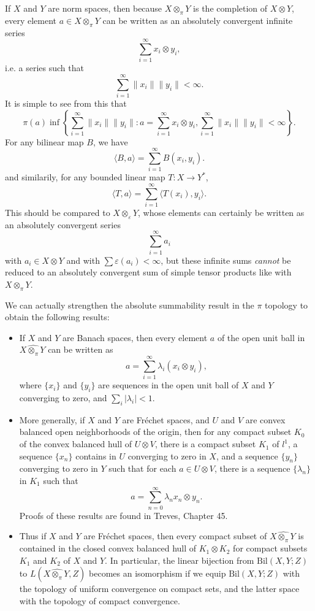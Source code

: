 If $X$ and $Y$ are norm spaces, then because $X \otimes_\pi Y$ is the completion of $X \otimes Y$, every element $a \in X \otimes_\pi Y$ can be written as an absolutely convergent infinite series
%
\[ \sum_{i = 1}^\infty x_i \otimes y_i, \]
%
i.e. a series such that
%
\[ \sum_{i = 1}^\infty \| x_i \| \| y_i \| < \infty. \]
%
It is simple to see from this that
%
\[ \pi(a) \inf \left\{ \sum_{i = 1}^\infty \| x_i \| \| y_i \| : a = \sum_{i = 1}^\infty x_i \otimes y_i, \sum_{i = 1}^\infty \| x_i \| \| y_i \| < \infty \right\}. \]
%
For any bilinear map $B$, we have
%
\[ \langle B, a \rangle = \sum_{i = 1}^\infty B(x_i,y_i). \]
%
and similarily, for any bounded linear map $T: X \to Y^*$,
%
\[ \langle T, a \rangle = \sum_{i = 1}^\infty \langle T(x_i), y_i \rangle. \]
%
This should be compared to $X \otimes_\varepsilon Y$, whose elements can certainly be written as an absolutely convergent series
%
\[ \sum_{i = 1}^\infty a_i \]
%
with $a_i \in X \otimes Y$ and with $\sum \varepsilon(a_i) < \infty$, but these infinite sums \emph{cannot} be reduced to an absolutely convergent sum of simple tensor products like with $X \otimes_\pi Y$.

\begin{remark}
    We can actually strengthen the absolute summability result in the $\pi$ topology to obtain the following results:
    \begin{itemize}
        \item If $X$ and $Y$ are Banach spaces, then every element $a$ of the open unit ball in $X \widehat{\otimes_\pi} Y$ can be written as
        \[ a = \sum_{i = 1}^\infty \lambda_i (x_i \otimes y_i), \]
        where $\{ x_i \}$ and $\{ y_i \}$ are sequences in the open unit ball of $X$ and $Y$ converging to zero, and $\sum_i |\lambda_i| < 1$.

        \item More generally, if $X$ and $Y$ are Fr\'{e}chet spaces, and $U$ and $V$ are convex balanced open neighborhoods of the origin, then for any compact subset $K_0$ of the convex balanced hull of $U \otimes V$, there is a compact subset $K_1$ of $l^1$, a sequence $\{ x_n \}$ contains in $U$ converging to zero in $X$, and a sequence $\{ y_n \}$ converging to zero in $Y$ such that for each $a \in U \otimes V$, there is a sequence $\{ \lambda_n \}$ in $K_1$ such that
        \[ a = \sum_{n = 0}^\infty \lambda_n x_n \otimes y_n. \]
        Proofs of these results are found in Treves, Chapter 45.

        \item Thus if $X$ and $Y$ are Fr\'{e}chet spaces, then every compact subset of $X \widehat{\otimes_\pi} Y$ is contained in the closed convex balanced hull of $K_1 \otimes K_2$ for compact subsets $K_1$ and $K_2$ of $X$ and $Y$. In particular, the linear bijection from $\text{Bil}(X,Y;Z)$ to $L(X \widehat{\otimes_\pi} Y, Z)$ becomes an isomorphism if we equip $\text{Bil}(X,Y;Z)$ with the topology of uniform convergence on compact sets, and the latter space with the topology of compact convergence.
    \end{itemize}
 \end{remark}

